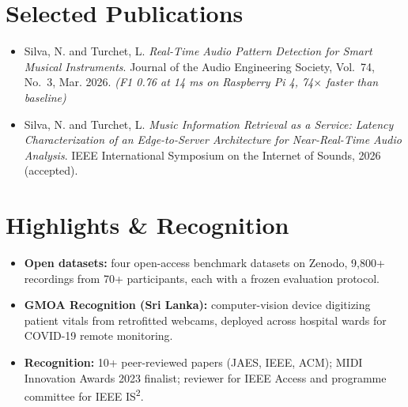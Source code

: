 \documentclass[11pt]{article}
\begin{document}
\section*{Selected Publications \footnotesize {}}
\begin{itemize}[leftmargin=1.2em, itemsep=-0.25em]
    \item Silva, N. and Turchet, L. \textit{Real-Time Audio Pattern Detection for Smart Musical Instruments}. Journal of the Audio Engineering Society, Vol.~74, No.~3, Mar. 2026. \textit{(F1 0.76 at 14 ms on Raspberry Pi 4, 74$\times$ faster than baseline)}
    \item Silva, N. and Turchet, L. \textit{Music Information Retrieval as a Service: Latency Characterization of an Edge-to-Server Architecture for Near-Real-Time Audio Analysis}. IEEE International Symposium on the Internet of Sounds, 2026 (accepted).
\end{itemize}

\enlargethispage{6\baselineskip}
\vspace{-0.5em}
\section*{Highlights \& Recognition}
\begin{itemize}[leftmargin=1.2em, itemsep=-0.25em]
    \item \textbf{Open datasets:} four open-access benchmark datasets on Zenodo, 9,800+ recordings from 70+ participants, each with a frozen evaluation protocol.
    \item \textbf{GMOA Recognition (Sri Lanka):} computer-vision device digitizing patient vitals from retrofitted webcams, deployed across hospital wards for COVID-19 remote monitoring.
    \item \textbf{Recognition:} 10+ peer-reviewed papers (JAES, IEEE, ACM); MIDI Innovation Awards 2023 finalist; reviewer for IEEE Access and programme committee for IEEE IS\textsuperscript{2}.
\end{itemize}
\end{document}
